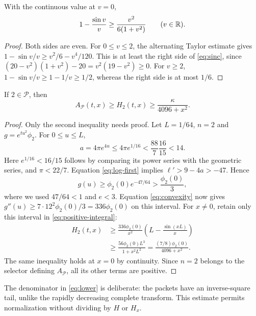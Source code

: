 \begin{lemma}\label{lem:sinc}
With the continuous value at $v=0$,
\begin{equation}\label{eq:sinc}
 1-\frac{\sin v}{v}\ge\frac{v^2}{6(1+v^2)}
 \qquad(v\in\mathbb R).
\end{equation}
\end{lemma}
\begin{proof}
Both sides are even. For $0\le v\le2$, the alternating Taylor estimate
gives $1-\sin v/v\ge v^2/6-v^4/120$. This is at least the right side
of \eqref{eq:sinc}, since
$(20-v^2)(1+v^2)-20=v^2(19-v^2)\ge0$.
For $v\ge2$, $1-\sin v/v\ge1-1/v\ge1/2$, whereas the right side is
at most $1/6$.
\end{proof}

\begin{proposition}\label{prop:lower}
If $2\in\mathcal P$, then
\begin{equation}\label{eq:lower}
 A_{\mathcal P}(t,x)\ge H_2(t,x)
       \ge\frac{\kappa}{4096+x^2}.
\end{equation}
\end{proposition}
\begin{proof}
Only the second inequality needs proof. Let $L=1/64$, $n=2$ and
$g=e^{tu^2}\phi_2$. For $0\le u\le L$,
\[
 a=4\pi e^{4u}\le4\pi e^{1/16}
 <\frac{88}{7}\frac{16}{15}<14.
\]
Here $e^{1/16}<16/15$ follows by comparing its power series with the
geometric series, and $\pi<22/7$. Equation \eqref{eq:log-first} implies
$\ell'>9-4a>-47$. Hence
\[
 g(u)\ge\phi_2(0)e^{-47/64}>\frac{\phi_2(0)}3,
\]
where we used $47/64<1$ and $e<3$. Equation \eqref{eq:convexity} now gives
$g''(u)\ge7\cdot12^2\phi_2(0)/3=336\phi_2(0)$ on this interval.
For $x\ne0$, retain only this interval in \eqref{eq:positive-integral}:
\begin{align*}
 H_2(t,x)
 &\ge\frac{336\phi_2(0)}{x^2}
       \left(L-\frac{\sin(xL)}x\right)\\
 &\ge\frac{56\phi_2(0)L^3}{1+x^2L^2}
  =\frac{(7/8)\phi_2(0)}{4096+x^2}.
\end{align*}
The same inequality holds at $x=0$ by continuity. Since $n=2$ belongs to
the selector defining $A_{\mathcal P}$, all its other terms are positive.
\end{proof}

The denominator in \eqref{eq:lower} is deliberate: the packets have an
inverse-square tail, unlike the rapidly decreasing complete transform.
This estimate permits normalization without dividing by $H$ or $H_x$.

